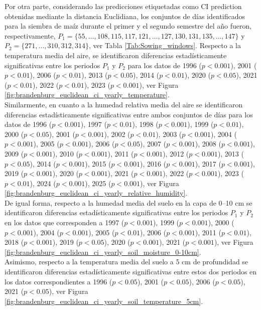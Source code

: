 Por otra parte, considerando las predicciones etiquetadas como CI prediction obtenidas mediante la distancia Euclidiana, los conjuntos de días identificados para la siembra de maíz durante el primer y el segundo semestre del año fueron, respectivamente, $P_1=\{55,\ldots,108, 115, 117, 121,\ldots, 127, 130, 131, 135, \ldots,147\}$ y $P_2=\{271,\ldots,310,312,314\}$, ver Tabla \ref{Tab:Sowing_windows}. Respecto a la temperatura media del aire, se identificaron diferencias estadísticamente significativas entre los periodos $P_1$ y $P_2$ para los datos de 1996 ($p<0.001$), 2001 ($p<0.01$), 2006 ($p<0.01$),
 2013 ($p<0.05$), 2014 ($p<0.01$), 2020 ($p<0.05$),
 2021 ($p<0.01$), 2022 ($p<0.01$), 2023 ($p<0.001$), ver Figura \ref{fig:brandenburg_euclidean_ci_yearly_temperature}.\\
 
 Similarmente, en cuanto a la humedad relativa media del aire se identificaron diferencias estadísticamente significativas entre ambos conjuntos de días para los datos de 1996 ($p<0.001$), 1997	($p<0.01$), 1998	($p<0.001$), 1999	($p<0.01$), 2000	($p<0.05$), 2001	($p<0.001$), 2002	($p<0.01$), 2003	($p<0.001$), 2004	($p<0.001$), 2005	($p<0.001$), 2006	($p<0.05$), 2007	($p<0.001$), 2008	($p<0.001$), 2009	($p<0.001$), 2010	($p<0.001$), 2011	($p<0.001$), 2012	($p<0.001$), 2013	($p<0.05$), 2014	($p<0.001$), 2015	($p<0.001$), 2016	($p<0.001$), 2017	($p<0.001$), 2019	($p<0.001$), 2020	($p<0.001$), 2021	($p<0.001$), 2022	($p<0.001$), 2023	($p<0.01$), 2024	($p<0.001$), 2025	($p<0.001$), ver Figura \ref{fig:brandenburg_euclidean_ci_yearly_relative_humidity}.\\
 

De igual forma, respecto a la humedad media del suelo en la capa de 0--10 cm se identificaron diferencias estadísticamente significativas entre los periodos $P_1$ y $P_2$ en los datos que corresponden a 1997	($p<0.001$), 1999	($p<0.001$), 2000	($p<0.001$), 2004	($p<0.001$), 2005	($p<0.01$), 2006	($p<0.001$), 2011	($p<0.01$), 2018	($p<0.001$), 2019	($p<0.05$), 2020	($p<0.001$), 2021	($p<0.001$), ver Figura \ref{fig:brandenburg_euclidean_ci_yearly_soil_moisture_0-10cm}.\\

Asimismo, respecto a la temperatura media del suelo a 5 cm de profundidad se identificaron diferencias estadísticamente significativas entre estos dos periodos en los datos correspondientes a 1996 ($p<0.05$), 2001 ($p<0.05$),
2006 ($p<0.05$), 2021 ($p<0.05$), ver Figura \ref{fig:brandenburg_euclidean_ci_yearly_soil_temperature_5cm}.\\

